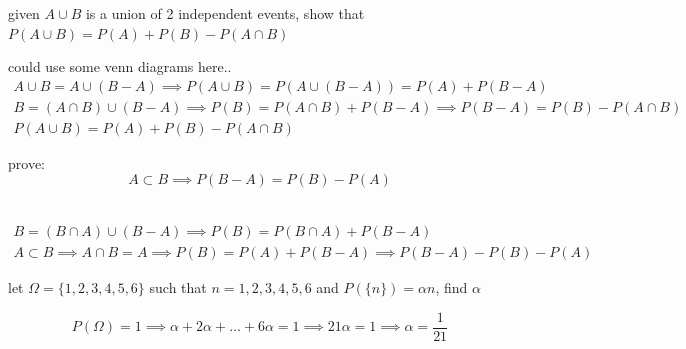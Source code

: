 \documentclass[a4paper,12pt]{article}
\begin{document}
\begin{definition}
\begin{question}
given \(A \cup B\) is a union of 2 independent events, show that \(P(A \cup B) = P(A) + P(B) - P(A \cap B)\)\\
\begin{answer}
could use some venn diagrams here..\\
\begin{gather*}
  A \cup B = A \cup (B - A) \implies P(A \cup B) = P(A \cup (B - A)) = P(A) + P(B - A)\\
  B = (A \cap B) \cup (B - A) \implies P(B) = P(A \cap B) + P(B - A) \implies P(B - A) = P(B) - P(A \cap B)\\
  P(A \cup B) = P(A) + P(B) - P(A \cap B)
\end{gather*}
\end{answer}
\end{question}
\begin{question}
prove:\\
\[
A \subset B \implies P(B-A) = P(B)-P(A)
\]\\
\begin{answer}
\begin{gather*}
  B = (B \cap A) \cup (B - A) \implies P(B) = P(B \cap A) + P(B - A)\\
  A \subset B \implies A \cap B = A \implies P(B) = P(A) + P(B - A) \implies P(B - A) - P(B) - P(A)
\end{gather*}
\end{answer}
\end{question}
\begin{question}
let \(\Omega = \{1,2,3,4,5,6\}\) such that \(n=1,2,3,4,5,6\) and \(P(\{n\}) = \alpha n\), find \(\alpha\)\\
\begin{answer}
\[
P(\Omega) = 1 \implies \alpha + 2\alpha + \dots + 6\alpha = 1 \implies 21\alpha = 1 \implies \alpha = \frac{1}{21}
\]\\
\end{answer}
\end{question}
\end{definition}
\end{document}
